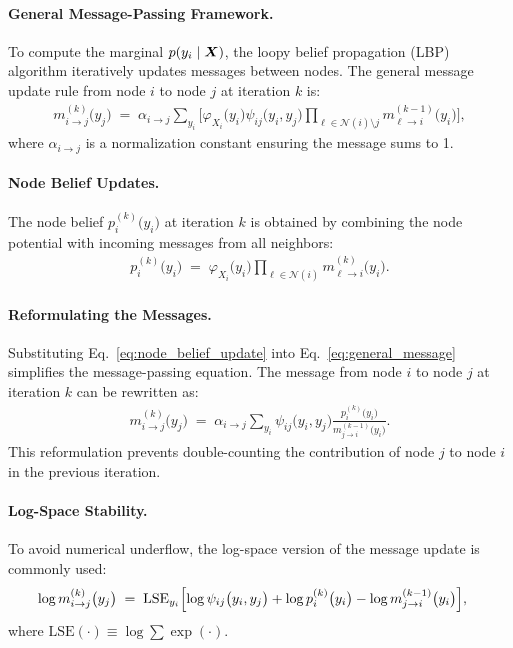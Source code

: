 \paragraph{General Message-Passing Framework.}
To compute the marginal \(p(y_i \mid \boldsymbol{X})\), the loopy belief propagation (LBP) algorithm iteratively updates messages between nodes. The general message update rule from node \(i\) to node \(j\) at iteration \(k\) is:
\begin{align}
    m_{i \to j}^{(k)}\bigl(y_j\bigr) 
    \;=\; 
    \alpha_{i \to j} \sum_{y_i} \Bigg[\varphi_{X_i}\bigl(y_i\bigr) \psi_{ij}\bigl(y_i, y_j\bigr)
    \prod_{\ell \in \mathcal{N}(i) \setminus j} m_{\ell \to i}^{(k-1)}\bigl(y_i\bigr)\Bigg],
    \label{eq:general_message}
\end{align}
where \(\alpha_{i \to j}\) is a normalization constant ensuring the message sums to 1.

\paragraph{Node Belief Updates.}
The node belief \(p_i^{(k)}\bigl(y_i\bigr)\) at iteration \(k\) is obtained by combining the node potential with incoming messages from all neighbors:
\begin{align}
    p_i^{(k)}\bigl(y_i\bigr) 
    \;=\; 
    \varphi_{X_i}\bigl(y_i\bigr) 
    \prod_{\ell \in \mathcal{N}(i)} m_{\ell \to i}^{(k)}\bigl(y_i\bigr).
    \label{eq:node_belief_update}
\end{align}

\paragraph{Reformulating the Messages.}
Substituting Eq.~\eqref{eq:node_belief_update} into Eq.~\eqref{eq:general_message} simplifies the message-passing equation. The message from node \(i\) to node \(j\) at iteration \(k\) can be rewritten as:
\begin{align}
    m_{i \to j}^{(k)}\bigl(y_j\bigr) 
    \;=\; 
    \alpha_{i \to j} \sum_{y_i} \psi_{ij}\bigl(y_i, y_j\bigr) 
    \frac{p_i^{(k)}\bigl(y_i\bigr)}{m_{j \to i}^{(k-1)}\bigl(y_i\bigr)}.
    \label{eq:message_reformulation}
\end{align}
This reformulation prevents double-counting the contribution of node \(j\) to node \(i\) in the previous iteration.

\paragraph{Log-Space Stability.}
To avoid numerical underflow, the log-space version of the message update is commonly used:
\begin{align}
    \log m_{i \to j}^{(k)}\bigl(y_j\bigr) 
    &\;=\; 
    \mathrm{LSE}_{y_i} \Bigl[\log \psi_{ij}\bigl(y_i, y_j\bigr) + \log p_i^{(k)}\bigl(y_i\bigr) - \log m_{j \to i}^{(k-1)}\bigl(y_i\bigr)\Bigr],
\end{align}
where \(\mathrm{LSE}(\cdot) \equiv \log \sum \exp(\cdot)\).

